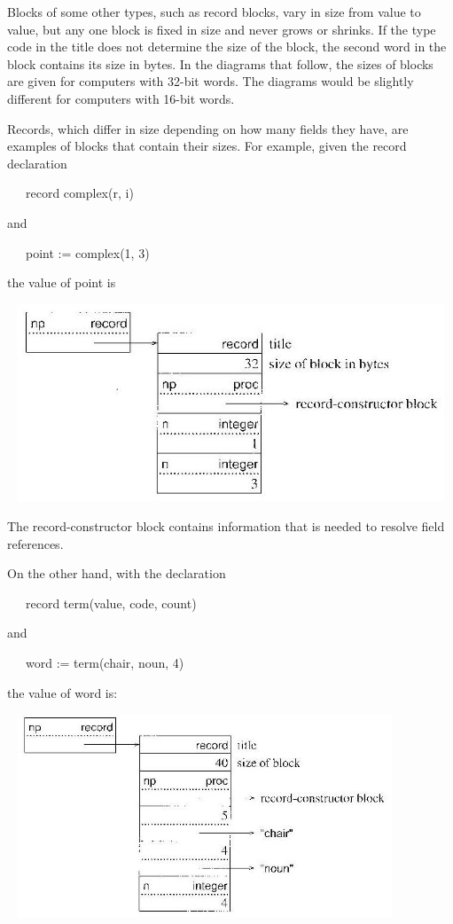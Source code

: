 Blocks of some other types, such as record blocks, vary in size from
value to value, but any one block is fixed in size and never grows or
shrinks. If the type code in the title does not determine the size of
the block, the second word in the block contains its size in bytes. In
the diagrams that follow, the sizes of blocks are given for computers
with 32-bit words. The diagrams would be slightly different for
computers with 16-bit words.

Records, which differ in size depending on how many fields they have,
are examples of blocks that contain their sizes.  For example, given
the record declaration

{\ttfamily\mdseries
\ \ \ record complex(r, i)}

and

{\ttfamily\mdseries
\ \ \ point := complex(1, 3)}

the value of point is

\begin{center}
\includegraphics[width=5.3098in,height=2.3193in]{ib-img/ib-img011.jpg}
\end{center}

The record-constructor block contains information that is needed to
resolve field references.

On the other hand, with the declaration

{\ttfamily\mdseries
\ \ \ record term(value, code, count)}

and

{\ttfamily\mdseries
\ \ \ word := term({\textquotedbl}chair{\textquotedbl}, {\textquotedbl}noun{\textquotedbl}, 4)}

the value of word is:

\begin{center}
\includegraphics[width=4.6398in,height=2.3799in]{ib-img/ib-img012.jpg}
\end{center}


